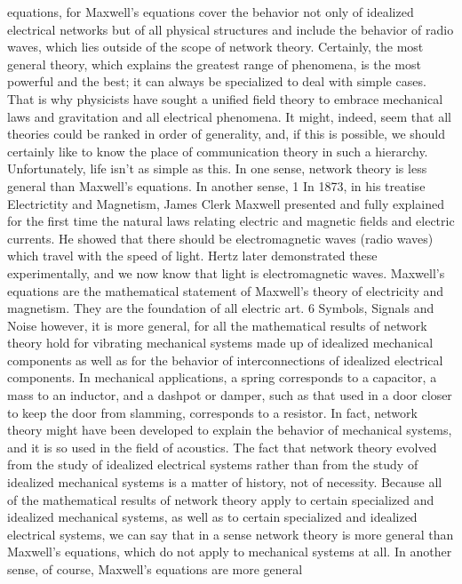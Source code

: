 equations, for Maxwell’s equations cover the behavior not only of
idealized electrical networks but of all physical structures and
include the behavior of radio waves, which lies outside of the scope
of network theory.
Certainly, the most general theory, which explains the greatest
range of phenomena, is the most powerful and the best; it can
always be specialized to deal with simple cases. That is why physicists
have sought a unified field theory to embrace mechanical
laws and gravitation and all electrical phenomena. It might, indeed,
seem that all theories could be ranked in order of generality, and,
if this is possible, we should certainly like to know the place of
communication theory in such a hierarchy.
Unfortunately, life isn’t as simple as this. In one sense, network
theory is less general than Maxwell’s equations. In another sense,
1 In 1873, in his treatise Electrictity and Magnetism, James Clerk Maxwell presented
and fully explained for the first time the natural laws relating electric and
magnetic fields and electric currents. He showed that there should be electromagnetic
waves (radio waves) which travel with the speed of light. Hertz later demonstrated
these experimentally, and we now know that light is electromagnetic waves. Maxwell’s
equations are the mathematical statement of Maxwell’s theory of electricity
and magnetism. They are the foundation of all electric art.
6
Symbols, Signals and Noise
however, it is more general, for all the mathematical results of
network theory hold for vibrating mechanical systems made up of
idealized mechanical components as well as for the behavior of
interconnections of idealized electrical components. In mechanical
applications, a spring corresponds to a capacitor, a mass to an
inductor, and a dashpot or damper, such as that used in a door
closer to keep the door from slamming, corresponds to a resistor.
In fact, network theory might have been developed to explain the
behavior of mechanical systems, and it is so used in the field of
acoustics. The fact that network theory evolved from the study of
idealized electrical systems rather than from the study of idealized
mechanical systems is a matter of history, not of necessity.
Because all of the mathematical results of network theory apply
to certain specialized and idealized mechanical systems, as well as
to certain specialized and idealized electrical systems, we can say
that in a sense network theory is more general than Maxwell’s
equations, which do not apply to mechanical systems at all. In
another sense, of course, Maxwell’s equations are more general
